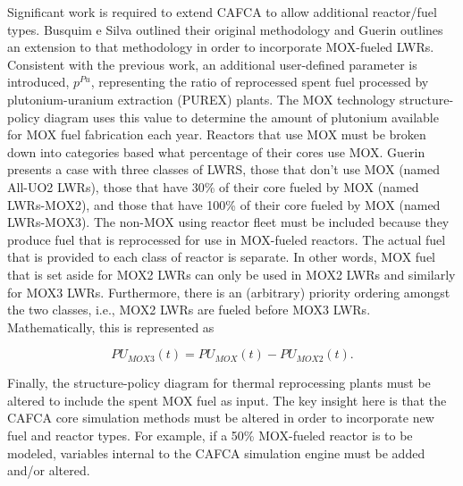 Significant work is required to extend CAFCA to allow additional reactor/fuel
types. Busquim e Silva outlined their original
methodology \cite{busquim_e_silva_system_2008} and Guerin outlines an extension
to that methodology \cite{guerin_impact_2009} in order to incorporate MOX-fueled
LWRs. Consistent with the previous work, an additional user-defined parameter is
introduced, $p^{Pu}$, representing the ratio of reprocessed spent fuel processed
by plutonium-uranium extraction (PUREX) plants. The MOX technology
structure-policy diagram uses this value to determine the amount of plutonium
available for MOX fuel fabrication each year. Reactors that use MOX must be
broken down into categories based what percentage of their cores use MOX. Guerin
presents a case with three classes of LWRS, those that don't use MOX (named
All-UO2 LWRs), those that have 30\% of their core fueled by MOX (named
LWRs-MOX2), and those that have 100\% of their core fueled by MOX (named
LWRs-MOX3). The non-MOX using reactor fleet must be included because they
produce fuel that is reprocessed for use in MOX-fueled reactors. The actual fuel
that is provided to each class of reactor is separate. In other words, MOX fuel
that is set aside for MOX2 LWRs can only be used in MOX2 LWRs and similarly for
MOX3 LWRs. Furthermore, there is an (arbitrary) priority ordering amongst the
two classes, i.e., MOX2 LWRs are fueled before MOX3 LWRs. Mathematically, this
is represented as

\begin{equation}
PU_{MOX3}(t) = PU_{MOX}(t) - PU_{MOX2}(t).
\end{equation}

Finally, the structure-policy diagram for thermal reprocessing plants must be
altered to include the spent MOX fuel as input. The key insight here is that the
CAFCA core simulation methods must be altered in order to incorporate new fuel
and reactor types. For example, if a 50\% MOX-fueled reactor is to be modeled,
variables internal to the CAFCA simulation engine must be added and/or altered. 
